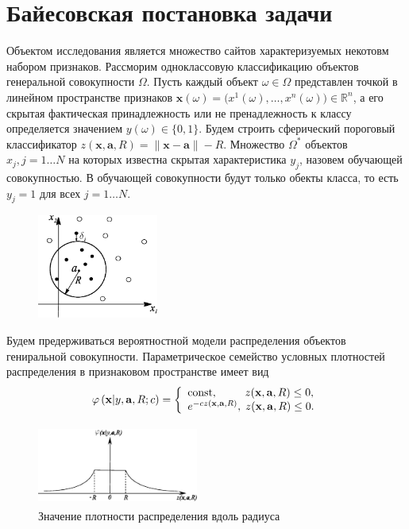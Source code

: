 \documentclass[12pt,a4paper]{amsart}
\begin{document}
\section{Байесовская постановка задачи}
Объектом исследования является множество сайтов характеризуемых некотовм набором признаков.
Рассморим одноклассовую классификацию объектов генеральной совокупности $\Omega$.
Пусть каждый объект $\omega \in{\Omega}$  представлен точкой в линейном пространстве признаков
$\mathbf{x}(\omega)=\bigl(x^{1}(\omega),\ldots,x^{n}(\omega)\bigr) \in {\mathbb{R}^n}$,
а его скрытая фактическая принадлежность или не пренадлежность к классу
определяется значением $y(\omega)\in{\{0,1\}}$. Будем строить сферический пороговый классификатор
$z(\mathbf{x},\mathbf{a},R)=\left\|\mathbf{x}-\mathbf{a}\right\|-R$. Множество $\Omega^*$ объектов 
$x_j, j=1 \ldots N$ на которых известна скрытая характеристика $y_j$, назовем обучающей совокупностью. 
В обучающей совокупности будут только обекты класса, то есть $y_j=1$ для всех $j=1\ldots N$.

\begin{figure}[H]
\includegraphics[width=150px, height=130px]{fig1.eps}
\end{figure}

Будем предерживаться вероятностной модели распределения объектов гениральной совокупности. 
Параметрическое семейство условных плотностей распределения в признаковом пространстве имеет вид 
\begin{equation}
\label{prob1}
   \varphi \left( {\mathbf x | y,\mathbf{a},R;c} \right) =
   \left\{\begin{array}{l}
   {{\rm const}},\;\;\;\;\;\;\;\;\;z(\mathbf{x},\mathbf{a},R) \leq 0, \\
   e^{-c z(\mathbf{x},\mathbf{a},R)},\;z(\mathbf{x},\mathbf{a},R) \leq 0.
 \end{array}\right.
\vspace{-5pt}
\end{equation}

\begin{figure}[H]
\includegraphics[width=200px, height=100px]{fig2.eps}
\caption{Значение плотности распределения вдоль радиуса}
\end{figure}
\end{document}
